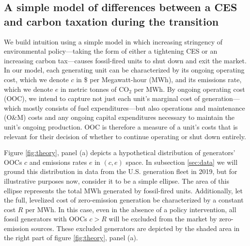 \documentclass[12pt]{article}
\begin{document}
\subsection{A simple model of differences between a CES and carbon taxation during the  transition}\label{sec:transition_model}

We build intuition using a simple model in which increasing stringency of environmental policy---taking the form of either a tightening CES or an increasing carbon tax---causes fossil-fired units to shut down and exit the market. In our model, each generating unit can be characterized by its ongoing operating cost, which we denote $c$ in \$ per Megawatt-hour (MWh), and its emissions rate, which we denote $e$ in metric tonnes of CO$_2$ per MWh. By ongoing operating cost (OOC), we intend to capture not just each unit's marginal cost of generation---which mostly consists of fuel expenditures---but also operations and maintenance (O\&M) costs and any ongoing capital expenditures necessary to maintain the unit's ongoing production. OOC is therefore a measure of a unit's costs that is relevant for their decision of whether to continue operating or shut down entirely.

Figure \ref{fig:theory}, panel (a) depicts a hypothetical distribution of generators' OOCs $c$ and emissions rates $e$ in $(c,e)$ space. In subsection \ref{sec:data} we will ground this distribution in data from the U.S. generation fleet in 2019, but for illustrative purposes now, consider it to be a simple ellipse. The area of this ellipse represents the total MWh generated by fossil-fired units. Additionally, let the full, levelized cost of zero-emission generation be characterized by a constant cost $R$ per MWh. In this case, even in the absence of a policy intervention, all fossil generators with OOCs $c>R$ will be excluded from the market by zero-emission sources. These excluded generators are depicted by the shaded area in the right part of figure \ref{fig:theory}, panel (a).
 
\end{document}
